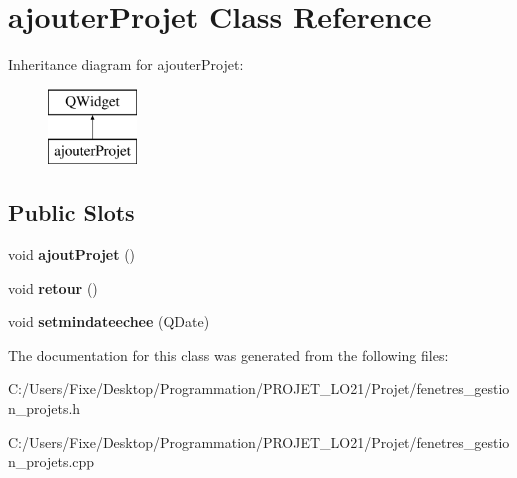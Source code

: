\hypertarget{classajouter_projet}{}\section{ajouter\+Projet Class Reference}
\label{classajouter_projet}
Inheritance diagram for ajouter\+Projet\+:\begin{figure}[H]
\begin{center}
\leavevmode
\includegraphics[height=2.000000cm]{classajouter_projet}
\end{center}
\end{figure}
\subsection*{Public Slots}
\begin{DoxyCompactItemize}
\item 
\hypertarget{classajouter_projet_a7e77825fcd09031b2b80e44dbd6f097d}{}void {\bfseries ajout\+Projet} ()\label{classajouter_projet_a7e77825fcd09031b2b80e44dbd6f097d}

\item 
\hypertarget{classajouter_projet_ad59793f984475f6b2587f10164756a21}{}void {\bfseries retour} ()\label{classajouter_projet_ad59793f984475f6b2587f10164756a21}

\item 
\hypertarget{classajouter_projet_ab9a035b462f0dd84a702cc7abc96a5cb}{}void {\bfseries setmindateechee} (Q\+Date)\label{classajouter_projet_ab9a035b462f0dd84a702cc7abc96a5cb}

\end{DoxyCompactItemize}


The documentation for this class was generated from the following files\+:\begin{DoxyCompactItemize}
\item 
C\+:/\+Users/\+Fixe/\+Desktop/\+Programmation/\+P\+R\+O\+J\+E\+T\+\_\+\+L\+O21/\+Projet/fenetres\+\_\+gestion\+\_\+projets.\+h\item 
C\+:/\+Users/\+Fixe/\+Desktop/\+Programmation/\+P\+R\+O\+J\+E\+T\+\_\+\+L\+O21/\+Projet/fenetres\+\_\+gestion\+\_\+projets.\+cpp\end{DoxyCompactItemize}
